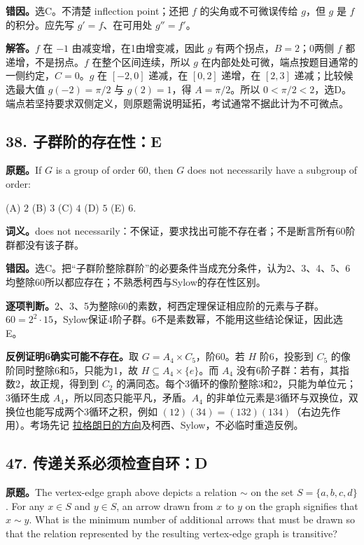 \documentclass[11pt,a4paper,fontset=fandol]{ctexart}
\begin{document}
\textbf{错因。}选C。不清楚 inflection point；还把 $f$ 的尖角或不可微误传给 $g$，但 $g$ 是 $f$ 的积分。应先写 $g'=f$、在可用处 $g''=f'$。

\textbf{解答。}$f$ 在 $-1$ 由减变增，在1由增变减，因此 $g$ 有两个拐点，$B=2$；0两侧 $f$ 都递增，不是拐点。$f$ 在整个区间连续，所以 $g$ 在内部处处可微，端点按题目通常的一侧约定，$C=0$。$g$ 在 $[-2,0]$ 递减，在 $[0,2]$ 递增，在 $[2,3]$ 递减；比较候选最大值 $g(-2)=\pi/2$ 与 $g(2)=1$，得 $A=\pi/2$。所以 $0<\pi/2<2$，选D。端点若坚持要求双侧定义，则原题需说明延拓，考试通常不据此计为不可微点。

\subsection{38. 子群阶的存在性：E}
\label{ms:q38}
\textbf{原题。}If $G$ is a group of order 60, then $G$ does not necessarily have a subgroup of order:

(A) $2$ \quad (B) $3$ \quad (C) $4$ \quad (D) $5$ \quad (E) $6$.

\textbf{词义。}does not necessarily：不保证，要求找出可能不存在者；不是断言所有60阶群都没有该子群。

\textbf{错因。}选C。把“子群阶整除群阶”的必要条件当成充分条件，认为2、3、4、5、6均整除60所以都应存在；不熟悉柯西与Sylow的存在性区别。

\textbf{逐项判断。}2、3、5为整除60的素数，柯西定理保证相应阶的元素与子群。$60=2^2\cdot15$，Sylow保证4阶子群。6不是素数幂，不能用这些结论保证，因此选E。

\textbf{反例证明6确实可能不存在。}取 $G=A_4\times C_5$，阶60。若 $H$ 阶6，投影到 $C_5$ 的像阶同时整除6和5，只能为1，故 $H\subseteq A_4\times\{e\}$。而 $A_4$ 没有6阶子群：若有，其指数2，故正规，得到到 $C_2$ 的满同态。每个3循环的像阶整除3和2，只能为单位元；3循环生成 $A_4$，所以同态只能平凡，矛盾。$A_4$ 的非单位元素是3循环与双换位，双换位也能写成两个3循环之积，例如 $(12)(34)=(132)(134)$（右边先作用）。考场先记 \hyperref[review:lagrange]{拉格朗日的方向}及柯西、Sylow，不必临时重造反例。

\subsection{47. 传递关系必须检查自环：D}
\label{ms:q47}
\textbf{原题。}The vertex-edge graph above depicts a relation $\sim$ on the set $S=\{a,b,c,d\}$. For any $x\in S$ and $y\in S$, an arrow drawn from $x$ to $y$ on the graph signifies that $x\sim y$. What is the minimum number of additional arrows that must be drawn so that the relation represented by the resulting vertex-edge graph is transitive?
\end{document}

